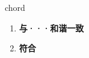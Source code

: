 
\begin{frame}
{\huge chord}
\begin{center}
\begin{enumerate}\Large
  \item \textbf{与···和谐一致}
  \item \textbf{符合}
\end{enumerate}
\end{center}
\end{frame}
